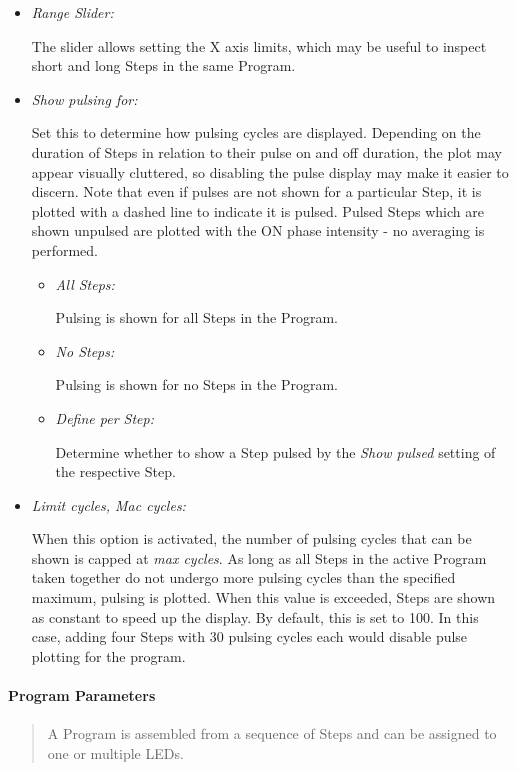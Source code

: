 \begin{itemize}
\item
  \emph{Range Slider:}

  The slider allows setting the X axis limits, which may be useful to
  inspect short and long Steps in the same Program.
\item
  \emph{Show pulsing for:}

  Set this to determine how pulsing cycles are displayed. Depending on
  the duration of Steps in relation to their pulse on and off duration,
  the plot may appear visually cluttered, so disabling the pulse display
  may make it easier to discern. Note that even if pulses are not shown
  for a particular Step, it is plotted with a dashed line to indicate it
  is pulsed. Pulsed Steps which are shown unpulsed are plotted with the
  ON phase intensity - no averaging is performed.

  \begin{itemize}
  \item
    \emph{All Steps:}

    Pulsing is shown for all Steps in the Program.
  \item
    \emph{No Steps:}

    Pulsing is shown for no Steps in the Program.
  \item
    \emph{Define per Step:}

    Determine whether to show a Step pulsed by the \emph{Show pulsed}
    setting of the respective Step.
  \end{itemize}
\item
  \emph{Limit cycles, Mac cycles:}

  When this option is activated, the number of pulsing cycles that can
  be shown is capped at \emph{max cycles}. As long as all Steps in the
  active Program taken together do not undergo more pulsing cycles than
  the specified maximum, pulsing is plotted. When this value is
  exceeded, Steps are shown as constant to speed up the display. By
  default, this is set to 100. In this case, adding four Steps with 30
  pulsing cycles each would disable pulse plotting for the program.
\end{itemize}

\hypertarget{program-parameters}{%
\paragraph{Program Parameters}\label{program-parameters}}

\begin{quote}
A Program is assembled from a sequence of Steps and can be assigned to
one or multiple LEDs.
\end{quote}

